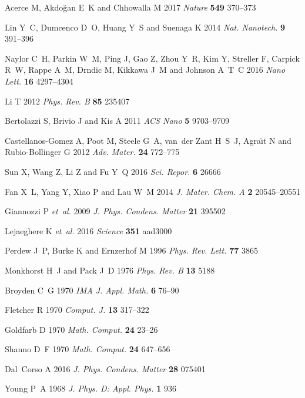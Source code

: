 \documentclass[12pt]{iopart}
\begin{document}
\begin{thebibliography}{10}
Acerce M, Akdo{\u{g}}an E~K and Chhowalla M 2017 {\em Nature\/} {\bf 549}
  370--373

Lin Y~C, Dumcenco D~O, Huang Y~S and Suenaga K 2014 {\em Nat. Nanotech.\/} {\bf
  9} 391--396

Naylor C~H, Parkin W~M, Ping J, Gao Z, Zhou Y~R, Kim Y, Streller F, Carpick
  R~W, Rappe A~M, Drndic M, Kikkawa J~M and Johnson A~T~C 2016 {\em Nano
  Lett.\/} {\bf 16} 4297--4304

Li T 2012 {\em Phys. Rev. B\/} {\bf 85} 235407

Bertolazzi S, Brivio J and Kis A 2011 {\em ACS Nano\/} {\bf 5} 9703--9709

Castellanos-Gomez A, Poot M, Steele G~A, van~der Zant H~S~J, Agra{\"\i}t N and
  Rubio-Bollinger G 2012 {\em Adv. Mater.\/} {\bf 24} 772--775

Sun X, Wang Z, Li Z and Fu Y~Q 2016 {\em Sci. Repor.\/} {\bf 6} 26666

Fan X~L, Yang Y, Xiao P and Lau W~M 2014 {\em J. Mater. Chem. A\/} {\bf 2}
  20545--20551

Giannozzi P {\em et~al.\/} 2009 {\em J. Phys. Condens. Matter\/} {\bf 21}
  395502

Lejaeghere K {\em et~al.\/} 2016 {\em Science\/} {\bf 351} aad3000

Perdew J~P, Burke K and Ernzerhof M 1996 {\em Phys. Rev. Lett.\/} {\bf 77} 3865

Monkhorst H~J and Pack J~D 1976 {\em Phys. Rev. B\/} {\bf 13} 5188

Broyden C~G 1970 {\em IMA J. Appl. Math.\/} {\bf 6} 76--90

Fletcher R 1970 {\em Comput. J.\/} {\bf 13} 317--322

Goldfarb D 1970 {\em Math. Comput.\/} {\bf 24} 23--26

Shanno D~F 1970 {\em Math. Comput.\/} {\bf 24} 647--656

Dal~Corso A 2016 {\em J. Phys. Condens. Matter\/} {\bf 28} 075401

Young P~A 1968 {\em J. Phys. D: Appl. Phys.\/} {\bf 1} 936


\end{thebibliography}
\end{document}
